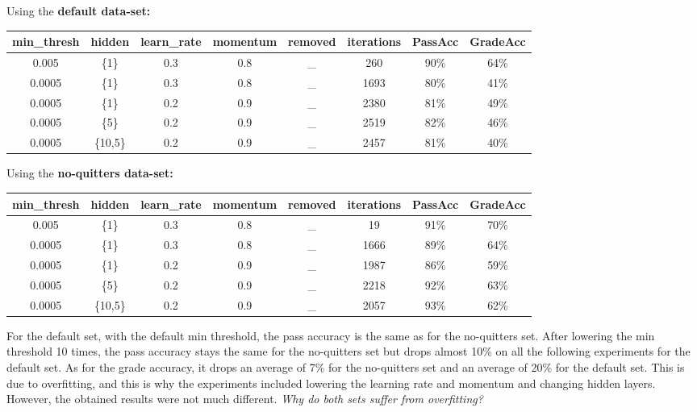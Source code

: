 \documentclass[11pt]{article}
\begin{document}
Using the \textbf{default data-set:}

\begin{tabular}{| c | c | c | c | c | c | c | c |}
\hline \textbf{min\_thresh} & \textbf{hidden} & \textbf{learn\_rate} & \textbf{momentum} & \textbf{removed} & \textbf{iterations} & \textbf{PassAcc} & \textbf{GradeAcc}\\
\hline 0.005 & \{1\} & 0.3 & 0.8 & \_ & 260 & 90\% & 64\%\\
\hline 0.0005 & \{1\} & 0.3 & 0.8 & \_ & 1693 & 80\% & 41\%\\
\hline 0.0005 & \{1\} & 0.2 & 0.9 & \_ & 2380 & 81\% & 49\%\\
\hline 0.0005 & \{5\} & 0.2 & 0.9 & \_ & 2519 & 82\% & 46\%\\
\hline 0.0005 & \{10,5\} & 0.2 & 0.9 & \_ & 2457 & 81\% & 40\%\\
\hline
\end{tabular}

\hfill \break
\hfill \break
Using the \textbf{no-quitters data-set:}

\begin{tabular}{| c | c | c | c | c | c | c | c |}
\hline \textbf{min\_thresh} & \textbf{hidden} & \textbf{learn\_rate} & \textbf{momentum} & \textbf{removed} & \textbf{iterations} & \textbf{PassAcc} & \textbf{GradeAcc}\\
\hline 0.005 & \{1\} & 0.3 & 0.8 & \_ & 19 & 91\% & 70\%\\
\hline 0.0005 & \{1\} & 0.3 & 0.8 & \_ & 1666 & 89\% & 64\%\\
\hline 0.0005 & \{1\} & 0.2 & 0.9 & \_ & 1987 & 86\% & 59\%\\
\hline 0.0005 & \{5\} & 0.2 & 0.9 & \_ & 2218 & 92\% & 63\%\\
\hline 0.0005 & \{10,5\} & 0.2 & 0.9 & \_ & 2057 & 93\% & 62\%\\
\hline
\end{tabular}

\hfill \break
\hfill \break

For the default set, with the default min threshold, the pass accuracy is the same as for the no-quitters set. After lowering the min threshold 10 times, the pass accuracy stays the same for the no-quitters set but drops almost 10\% on all the following experiments for the default set. As for the grade accuracy, it drops an average of 7\% for the no-quitters set and an average of 20\% for the default set. This is due to overfitting, and this is why the experiments included lowering the learning rate and momentum and changing hidden layers. However, the obtained results were not much different.
\hfill \break
\hfill \break
\textit{Why do both sets suffer from overfitting?}
\end{document}
